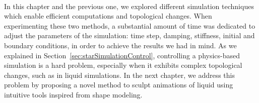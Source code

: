 \paragraph*{}
In this chapter and the previous one, we explored different simulation techniques which enable efficient computations and topological changes. 
When experimenting these two methods, a substantial amount of time was dedicated to adjust the parameters of the simulation: time step, damping, stiffness, initial and boundary conditions, in order to achieve the results we had in mind.
As we explained in Section~\ref{sec:starSimulationControl}, controlling a physics-based simulation is a hard problem, especially when it exhibits complex topological changes, such as in liquid simulations.
In the next chapter, we address this problem by proposing a novel method to sculpt animations of liquid using intuitive tools inspired from shape modeling.
